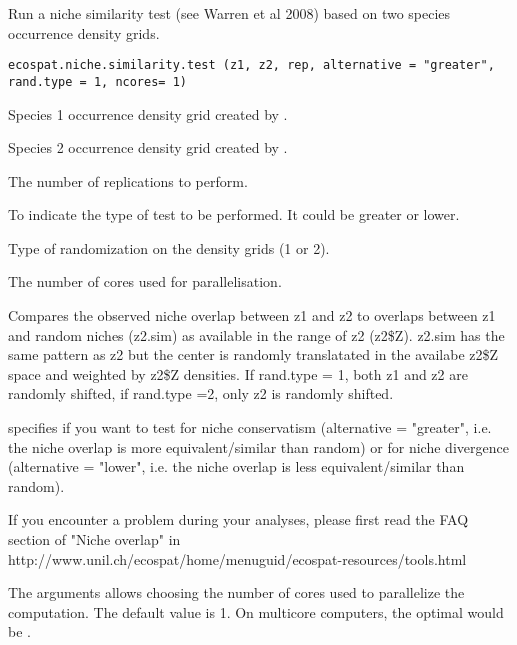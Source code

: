 \documentclass[a4paper]{book}
\begin{document}
%
\begin{SeeAlso}\relax
{}
\end{SeeAlso}
%
\begin{Description}\relax
Run a niche similarity test (see Warren et al 2008) based on two species occurrence density grids.
\end{Description}
%
\begin{Usage}
\begin{verbatim}
ecospat.niche.similarity.test (z1, z2, rep, alternative = "greater", 
rand.type = 1, ncores= 1)
\end{verbatim}
\end{Usage}
%
\begin{Arguments}
\begin{ldescription}
\item[\code{z1}] Species 1 occurrence density grid created by .
\item[\code{z2}] Species 2 occurrence density grid created by .
\item[\code{rep}] The number of replications to perform.
\item[\code{alternative}] To indicate the type of test to be performed. It could be greater or lower.
\item[\code{rand.type}] Type of randomization on the density grids (1 or 2).
\item[\code{ncores}] The number of cores used for parallelisation.

\end{ldescription}
\end{Arguments}
%
\begin{Details}\relax
Compares the observed niche overlap between z1 and z2 to overlaps between z1 and random niches (z2.sim) as available in the range of z2 (z2\$Z). z2.sim has the same pattern as z2 but the center is randomly translatated in the availabe z2\$Z space and weighted by z2\$Z densities.
If rand.type = 1, both z1 and z2 are randomly shifted, if rand.type =2, only z2 is randomly shifted.

 specifies if you want to test for niche conservatism (alternative = "greater", i.e. the niche overlap is more equivalent/similar than random) or for niche divergence (alternative = "lower", i.e. the niche overlap is less equivalent/similar than random). 

If you encounter a problem during your analyses, please first read the FAQ section of "Niche overlap" in http://www.unil.ch/ecospat/home/menuguid/ecospat-resources/tools.html

The arguments  allows choosing the number of cores used to parallelize the computation. The default value is 1. On multicore computers, the optimal would be . 

\end{Details}
\end{document}
